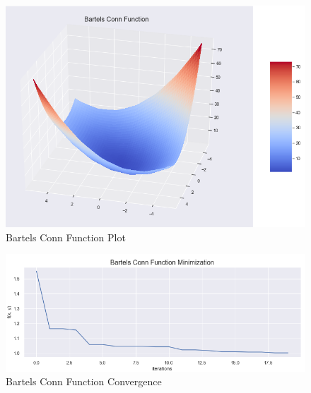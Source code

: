 \documentclass[A4, twocolumn]{article}
\begin{document}
 	\begin{figure}
 		\includegraphics[width=\linewidth]{bartels_conn/bartels_conn_plot.png}
 		\caption{Bartels Conn Function Plot}
 		\label{fig:Bartels Conn Function Plot}
 	\end{figure}
 	
 	
 	\begin{figure}
 		\includegraphics[width=\linewidth]{bartels_conn/bartels_conn_convergence.png}
 		\caption{Bartels Conn Function Convergence}
 		\label{fig:Bartels Conn Function Convergence}
 	\end{figure}
 	
\end{document}
